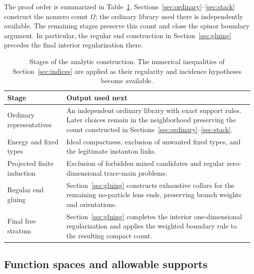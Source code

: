 The proof order is summarized in Table~\ref{tab:analysis:stages}.
Sections~\ref{sec:ordinary}--\ref{sec:stack} construct the nonzero count
$\Omega$; the ordinary library used there is independently available.
The remaining stages preserve this count and close the spinor boundary
argument.  In particular, the regular end construction in
Section~\ref{sec:gluing} precedes the final interior regularization there.
\begin{table}[htbp]
\centering
\small
\begin{tabular}{@{}p{}p{}@{}}
\toprule
Stage & Output used next \\
\midrule
Ordinary representatives & An independent ordinary library with exact
support rules.  Later choices remain in the neighborhood preserving
the count constructed in Sections~\ref{sec:ordinary}--\ref{sec:stack}. \\
Energy and fixed types & Ideal compactness, exclusion of unwanted fixed
types, and the legitimate instanton links. \\
Projected finite induction & Exclusion of forbidden mixed candidates
and regular zero-dimensional trace-main problems. \\
Regular end gluing & Section~\ref{sec:gluing} constructs exhaustive
collars for the remaining no-particle lens ends, preserving branch
weights and orientations. \\
Final free stratum & Section~\ref{sec:gluing} completes the interior
one-dimensional regularization and applies the weighted boundary rule
to the resulting compact count. \\
\bottomrule
\end{tabular}
\caption{Stages of the analytic construction.  The numerical
inequalities of Section~\ref{sec:indices} are applied as their
regularity and incidence hypotheses become available.}
\label{tab:analysis:stages}
\end{table}

\subsection{Function spaces and allowable supports}

